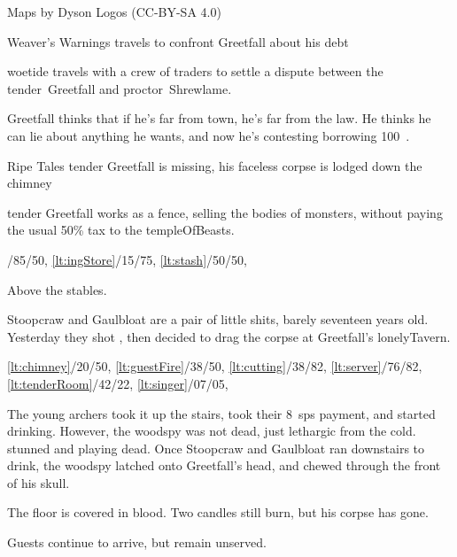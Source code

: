 \documentclass[10pt,twoside]{book}
\begin{document}

Maps by Dyson Logos (CC-BY-SA 4.0)



\clearpage
\pagestyle{minizine}%


{Weaver's Warnings}%
{ travels to confront Greetfall about his debt}%

\woetide

\Gls{woetide} travels with a crew of traders
to settle a dispute between the \Gls{tender}~Greetfall and \gls{proctor}~Shrewlame.

\begin{speechtext}
  Greetfall thinks that if he's far from town, he's far from the law.
  He thinks he can lie about anything he wants, and now he's contesting borrowing 100~.
\end{speechtext}

{Ripe Tales}%
{\Gls{tender} Greetfall is missing, his faceless corpse is lodged down the chimney}%

\begin{exampletext}
\Gls{tender} Greetfall works as a fence, selling the bodies of \glspl{monster}, without paying the usual 50\% tax to the \gls{templeOfBeasts}.

%
  {%
    /85/50,%
    \ref{lt:ingStore}/15/75,
    \ref{lt:stash}/50/50,
  }%
{Above the stables.\par}
Stoopcraw and Gaulbloat are a pair of little shits, barely seventeen years old.
Yesterday they shot , then decided to drag the corpse at Greetfall's \gls{lonelyTavern}.

%
{%
  \ref{lt:chimney}/20/50,
  \ref{lt:guestFire}/38/50,
  \ref{lt:cutting}/38/82,
  \ref{lt:server}/76/82,
  \ref{lt:tenderRoom}/42/22,
  \Large\ref{lt:singer}/07/05,
}%
{}

The young archers took it up the stairs, took their 8~\glspl{sp} payment, and started drinking.
However, the \gls{woodspy} was not dead, just
\ifcase\thetemperature%
  lethargic from the cold.
\else%
  stunned and playing dead.
\fi%
Once Stoopcraw and Gaulbloat ran downstairs to drink, the \gls{woodspy} latched onto Greetfall's head, and chewed through the front of his skull.

The floor is covered in blood.
Two candles still burn, but his corpse has gone.

Guests continue to arrive, but remain unserved.
\end{exampletext}
\end{document}
